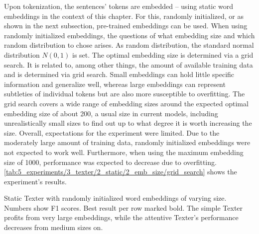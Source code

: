 Upon tokenization, the sentences' tokens are embedded -- using static word embeddings in the context of this chapter. For this, randomly initialized, or as shown in the next subsection, pre-trained embeddings can be used. When using randomly initialized embeddings, the questions of what embedding size and which random distribution to chose arises. As random distribution, the standard normal distribution $N(0, 1)$ is set. The optimal embedding size is determined via a grid search. It is related to, among other things, the amount of available training data and is determined via grid search. Small embeddings can hold little specific information and generalize well, whereas large embeddings can represent subtleties of individual tokens but are also more susceptible to overfitting. The grid search covers a wide range of embedding sizes around the expected optimal embedding size of about 200, a usual size in current models, including unrealistically small sizes to find out up to what degree it is worth increasing the size. Overall, expectations for the experiment were limited. Due to the moderately large amount of training data, randomly initialized embeddings were not expected to work well. Furthermore, when using the maximum embedding size of 1000, performance was expected to decrease due to overfitting. \autoref{tab:5_experiments/3_texter/2_static/2_emb_size/grid_search} shows the experiment's results.

\begin{table}[t]
    \makebox[\textwidth][c]{
        
    }
    \caption{Static Texter with randomly initialized word embeddings of varying size. Numbers show F1 scores. Best result per row marked bold. The simple Texter profits from very large embeddings, while the attentive Texter's performance decreases from medium sizes on.}
    \label{tab:5_experiments/3_texter/2_static/2_emb_size/grid_search}
\end{table}


